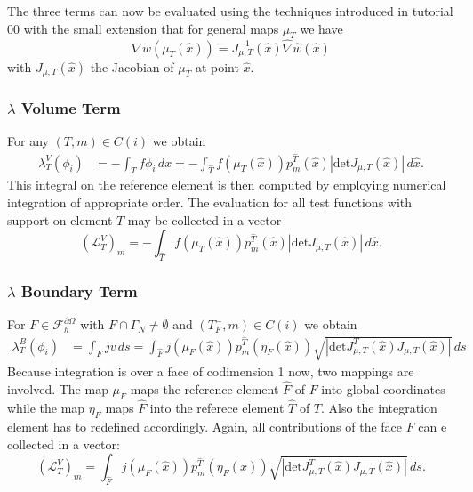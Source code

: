 \documentclass[a4paper,12pt]{article}
\begin{document}
The three terms can now be evaluated using the techniques introduced in 
tutorial 00 with the small extension that for general maps $\mu_T$ we
have 
$$\nabla w(\mu_T(\hat x)) = J_{\mu,T}^{-1}(\hat x) \hat\nabla \hat w (\hat x)$$
with $J_{\mu,T}(\hat x)$ the Jacobian of $\mu_T$ at point $\hat x$.

\subsubsection*{$\lambda$ Volume Term}

For any $(T,m)\in C(i)$ we obtain
\begin{equation*}
\begin{split}
\lambda_T^V(\phi_i) &= - \int_T f \phi_i \,dx = 
- \int_{\hat T} f(\mu_T(\hat x)) p_m^{\hat T}(\hat x) |\text{det} J_{\mu,T}(\hat x)|\, d\hat x .
\end{split}
\end{equation*}
This integral on the reference element is then computed by employing
numerical integration of appropriate order.
The evaluation for all test functions with support on element $T$ may be collected in
a vector 
\begin{equation*}
(\mathcal{L}_T^V)_m = - \int_{\hat T} f(\mu_T(\hat x)) p_m^{\hat T}(\hat x) 
|\text{det} J_{\mu,T}(\hat x)|\, d\hat x.
\end{equation*}

\subsubsection*{$\lambda$ Boundary Term}

For $F\in\mathcal{F}_h^{\partial\Omega}$ with $F\cap\Gamma_N\neq\emptyset$
and $(T_F^-,m)\in C(i)$ we obtain
\begin{equation*}
\begin{split}
\lambda_T^B(\phi_i) &= \int_{F} j v\,ds = 
\int_{\hat F} j(\mu_F(\hat x)) p_m^{\hat T}(\eta_F(\hat x)) 
\sqrt{|\text{det} J^T_{\mu,T}(\hat x)J_{\mu,T}(\hat x)|} \,ds
\end{split}
\end{equation*}
Because integration is over a face of codimension 1 now, two mappings are
involved. The map $\mu_F$ maps the reference element $\hat F$ of $F$ into
global coordinates while the map $\eta_F$ maps $\hat F$ into the referece
element $\hat T$ of $T$. Also the integration element has to redefined accordingly.
Again, all contributions of the face $F$ can e collected in a vector:
\begin{equation*}
(\mathcal{L}_T^V)_m = 
\int_{\hat F} j(\mu_F(\hat x)) p_m^{\hat T}(\eta_F(\hat x)) 
\sqrt{|\text{det} J^T_{\mu,T}(\hat x)J_{\mu,T}(\hat x)|} \,ds .
\end{equation*}
\end{document}
